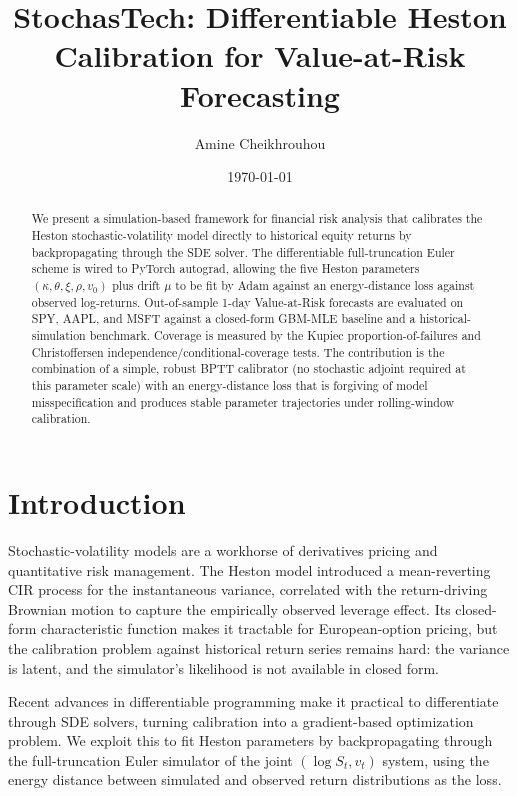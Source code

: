 \documentclass[11pt]{article}
\title{StochasTech: Differentiable Heston Calibration for Value-at-Risk Forecasting}
\author{Amine Cheikhrouhou}
\date{\today}
\begin{document}
\maketitle

\begin{abstract}
We present a simulation-based framework for financial risk analysis that
calibrates the Heston stochastic-volatility model directly to historical equity
returns by backpropagating through the SDE solver. The differentiable
full-truncation Euler scheme is wired to PyTorch autograd, allowing the five
Heston parameters $(\kappa, \theta, \xi, \rho, v_0)$ plus drift $\mu$ to be
fit by Adam against an energy-distance loss against observed log-returns.
Out-of-sample 1-day Value-at-Risk forecasts are evaluated on SPY, AAPL, and
MSFT against a closed-form GBM-MLE baseline and a historical-simulation
benchmark. Coverage is measured by the Kupiec proportion-of-failures and
Christoffersen independence/conditional-coverage tests. The contribution is
the combination of a simple, robust BPTT calibrator (no stochastic adjoint
required at this parameter scale) with an energy-distance loss that is
forgiving of model misspecification and produces stable parameter
trajectories under rolling-window calibration.
\end{abstract}

\section{Introduction}
\label{sec:intro}

Stochastic-volatility models are a workhorse of derivatives pricing and
quantitative risk management. The Heston model \cite{heston1993} introduced a
mean-reverting CIR process for the instantaneous variance, correlated with the
return-driving Brownian motion to capture the empirically observed leverage
effect. Its closed-form characteristic function makes it tractable for
European-option pricing, but the calibration problem against historical return
series remains hard: the variance is latent, and the simulator's likelihood is
not available in closed form.

Recent advances in differentiable programming \cite{li2020adjointsde,
chen2018neuralode} make it practical to differentiate through SDE solvers,
turning calibration into a gradient-based optimization problem. We exploit
this to fit Heston parameters by backpropagating through the full-truncation
Euler simulator \cite{lord2010biased} of the joint $(\log S_t, v_t)$ system,
using the energy distance \cite{szekely2013energy} between simulated and
observed return distributions as the loss.
\end{document}
